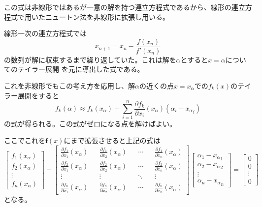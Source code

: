 \documentclass[a4paper,11pt]{jsarticle}
\begin{document}
この式は非線形ではあるが一意の解を持つ連立方程式であるから、線形の連立方程式で用いたニュートン法を非線形に拡張し用いる。

線形一次の連立方程式では
\begin{equation*}
    x_{n+1} = x_n - \frac{f(x_n)}{f'(x_n)}
\end{equation*}
の数列が解に収束するまで繰り返していた。これは解を$\alpha$とすると$x=\alpha$についてのテイラー展開
を元に導出した式である。

これを非線形でもこの考え方を応用し、解$\alpha$の近くの点$x=x_{\alpha}$での$f_k(x)$のテイラー展開をすると
\begin{displaymath}
    f_k(\alpha) \approx f_k(x_\alpha) + \sum_{i=1}^{n}\frac{\partial f_k}{\partial x_i}(x_\alpha)(\alpha_i - {x_\alpha}_i)
\end{displaymath}
の式が得られる。この式がゼロになる点を解けばよい。

ここでこれを$\textbf{f}(x)$にまで拡張させると上記の式は
\begin{equation*}
    \begin{bmatrix}
        f_1(x_\alpha) \\ f_2(x_\alpha) \\ \vdots \\ f_n(x_\alpha)
    \end{bmatrix}
    + 
    \begin{bmatrix}
        \frac{\partial f_1}{\partial x_1}(x_\alpha) && \frac{\partial f_1}{\partial x_2}(x_\alpha) && \cdots && \frac{\partial f_1}{\partial x_n}(x_\alpha) \\
        \frac{\partial f_2}{\partial x_1}(x_\alpha) && \frac{\partial f_2}{\partial x_2}(x_\alpha) && \cdots && \frac{\partial f_2}{\partial x_n}(x_\alpha) \\
        \vdots && \vdots && \ddots && \vdots \\
        \frac{\partial f_n}{\partial x_1}(x_\alpha) && \frac{\partial f_n}{\partial x_2}(x_\alpha) && \cdots && \frac{\partial f_n}{\partial x_n}(x_\alpha) 
    \end{bmatrix}
    \begin{bmatrix}
        \alpha_1 - {x_\alpha}_1 \\ \alpha_2 - {x_\alpha}_2 \\ \vdots \\ \alpha_n - {x_\alpha}_n
    \end{bmatrix}
    =
    \begin{bmatrix}
        0 \\ 0 \\ \vdots \\ 0
    \end{bmatrix}
\end{equation*}
となる。
\end{document}
